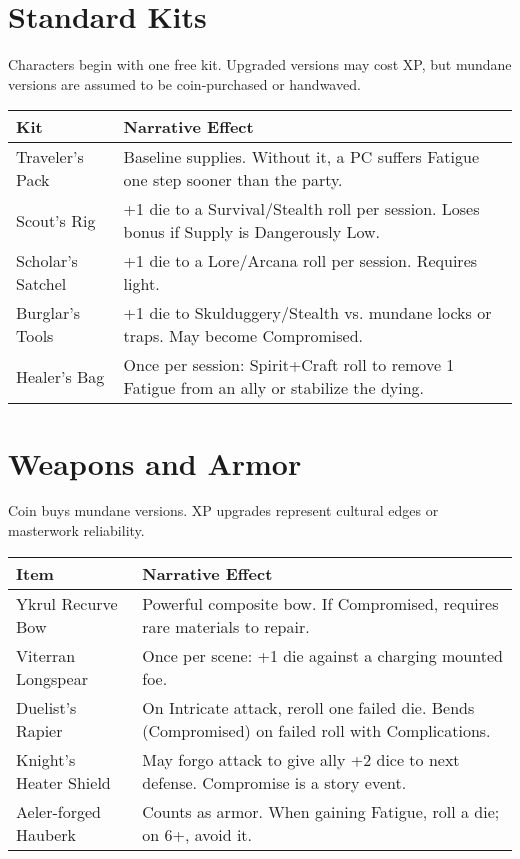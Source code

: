 \documentclass[12pt]{book}
\begin{document}
\section{Standard Kits}
Characters begin with one free kit. Upgraded versions may cost XP, but mundane versions are assumed to be coin-purchased or handwaved.

\begin{tabularx}{\textwidth}{lX}
\textbf{Kit} & \textbf{Narrative Effect} \\
\hline
Traveler’s Pack & Baseline supplies. Without it, a PC suffers Fatigue one step sooner than the party. \\
Scout’s Rig & +1 die to a Survival/Stealth roll per session. Loses bonus if Supply is Dangerously Low. \\
Scholar’s Satchel & +1 die to a Lore/Arcana roll per session. Requires light. \\
Burglar’s Tools & +1 die to Skulduggery/Stealth vs. mundane locks or traps. May become Compromised. \\
Healer’s Bag & Once per session: Spirit+Craft roll to remove 1 Fatigue from an ally or stabilize the dying. \\
\end{tabularx}

\section{Weapons and Armor}
Coin buys mundane versions. XP upgrades represent cultural edges or masterwork reliability.

\begin{tabularx}{\textwidth}{lX}
\textbf{Item} & \textbf{Narrative Effect} \\
\hline
Ykrul Recurve Bow & Powerful composite bow. If Compromised, requires rare materials to repair. \\
Viterran Longspear & Once per scene: +1 die against a charging mounted foe. \\
Duelist’s Rapier & On Intricate attack, reroll one failed die. Bends (Compromised) on failed roll with Complications. \\
Knight’s Heater Shield & May forgo attack to give ally +2 dice to next defense. Compromise is a story event. \\
Aeler-forged Hauberk & Counts as armor. When gaining Fatigue, roll a die; on 6+, avoid it. \\
\end{tabularx}
\end{document}
